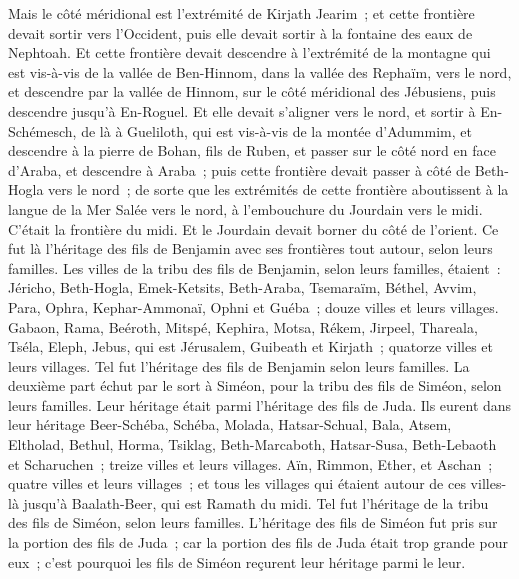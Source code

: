 \begin{multicols}{2}
Mais le côté méridional est l'extrémité de Kirjath Jearim~; et cette frontière devait sortir vers l'Occident, puis elle devait sortir à la fontaine des eaux de Nephtoah.
Et cette frontière devait descendre à l'extrémité de la montagne qui est vis-à-vis de la vallée de Ben-Hinnom, dans la vallée des Rephaïm, vers le nord, et descendre par la vallée de Hinnom, sur le côté méridional des Jébusiens, puis descendre jusqu'à En-Roguel.
Et elle devait s'aligner vers le nord, et sortir à En-Schémesch, de là à Gueliloth, qui est vis-à-vis de la montée d'Adummim, et descendre à la pierre de Bohan, fils de Ruben,
et passer sur le côté nord en face d'Araba, et descendre à Araba~;
puis cette frontière devait passer à côté de Beth-Hogla vers le nord~; de sorte que les extrémités de cette frontière aboutissent à la langue de la Mer Salée vers le nord, à l'embouchure du Jourdain vers le midi. C'était la frontière du midi.
Et le Jourdain devait borner du côté de l'orient. Ce fut là l'héritage des fils de Benjamin avec ses frontières tout autour, selon leurs familles.
Les villes de la tribu des fils de Benjamin, selon leurs familles, étaient~: Jéricho, Beth-Hogla, Emek-Ketsits,
Beth-Araba, Tsemaraïm, Béthel,
Avvim, Para, Ophra,
Kephar-Ammonaï, Ophni et Guéba~; douze villes et leurs villages.
Gabaon, Rama, Beéroth,
Mitspé, Kephira, Motsa,
Rékem, Jirpeel, Thareala,
Tséla, Eleph, Jebus, qui est Jérusalem, Guibeath et Kirjath~; quatorze villes et leurs villages. Tel fut l'héritage des fils de Benjamin selon leurs familles.
\VerseOne{}La deuxième part échut par le sort à Siméon, pour la tribu des fils de Siméon, selon leurs familles. Leur héritage était parmi l'héritage des fils de Juda.
Ils eurent dans leur héritage Beer-Schéba, Schéba, Molada,
Hatsar-Schual, Bala, Atsem,
Eltholad, Bethul, Horma,
Tsiklag, Beth-Marcaboth, Hatsar-Susa,
Beth-Lebaoth et Scharuchen~; treize villes et leurs villages.
Aïn, Rimmon, Ether, et Aschan~; quatre villes et leurs villages~;
et tous les villages qui étaient autour de ces villes-là jusqu'à Baalath-Beer, qui est Ramath du midi. Tel fut l'héritage de la tribu des fils de Siméon, selon leurs familles.
L'héritage des fils de Siméon fut pris sur la portion des fils de Juda~; car la portion des fils de Juda était trop grande pour eux~; c'est pourquoi les fils de Siméon reçurent leur héritage parmi le leur.

\end{multicols}
